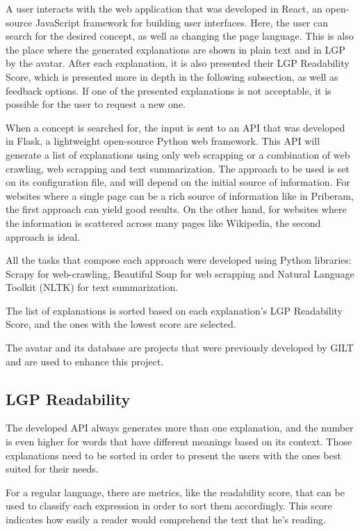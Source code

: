\documentclass[runningheads]{llncs}
\begin{document}
A user interacts with the web application that was developed in React\cite{react}, an open-source JavaScript framework for building user interfaces.
Here, the user can search for the desired concept, as well as changing the page language.
This is also the place where the generated explanations are shown in plain text and in LGP by the avatar.
After each explanation, it is also presented their LGP Readability Score, which is presented more in depth in the following subsection, as well as feedback options.
If one of the presented explanations is not acceptable, it is possible for the user to request a new one.

When a concept is searched for, the input is sent to an API that was developed in Flask\cite{flask}, a lightweight open-source Python web framework.
This API will generate a list of explanations using only web scrapping or a combination of web crawling, web scrapping and text summarization.
The approach to be used is set on its configuration file, and will depend on the initial source of information.
For websites where a single page can be a rich source of information like in Priberam\cite{priberam}, the first approach can yield good results.
On the other hand, for websites where the information is scattered across many pages like Wikipedia\cite{wikipedia}, the second approach is ideal.

All the tasks that compose each approach were developed using Python libraries: Scrapy\cite{scrapy} for web-crawling, Beautiful Soup\cite{bs4} for web scrapping and Natural Language Toolkit (NLTK)\cite{nltk} for text summarization.

The list of explanations is sorted based on each explanation's LGP Readability Score, and the ones with the lowest score are selected.

The avatar and its database are projects that were previously developed by GILT and are used to enhance this project.

\subsection{LGP Readability}

The developed API always generates more than one explanation, and the number is even higher for words that have different meanings based on its context.
Those explanations need to be sorted in order to present the users with the ones best suited for their needs.

For a regular language, there are metrics, like the readability score, that can be used to classify each expression in order to sort them accordingly.
This score indicates how easily a reader would comprehend the text that he's reading.
\end{document}

